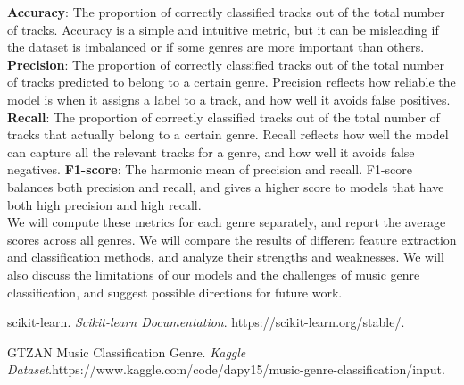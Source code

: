 \documentclass[conference]{IEEEtran}
\begin{document}
        \textbf{Accuracy}: The proportion of correctly classified tracks out of the total number of tracks. Accuracy is a simple and intuitive metric, but it can be misleading if the dataset is imbalanced or if some genres are more important than others.
        \textbf{Precision}: The proportion of correctly classified tracks out of the total number of tracks predicted to belong to a certain genre. Precision reflects how reliable the model is when it assigns a label to a track, and how well it avoids false positives.
        \newline
        \textbf{Recall}: The proportion of correctly classified tracks out of the total number of tracks that actually belong to a certain genre. Recall reflects how well the model can capture all the relevant tracks for a genre, and how well it avoids false negatives.
        \newline
        \textbf{F1-score}: The harmonic mean of precision and recall. F1-score balances both precision and recall, and gives a higher score to models that have both high precision and high recall.
        \newline \\
        We will compute these metrics for each genre separately, and report the average scores across all genres. We will compare the results of different feature extraction and classification methods, and analyze their strengths and weaknesses. We will also discuss the limitations of our models and the challenges of music genre classification, and suggest possible directions for future work.

    
    \begin{thebibliography}{99}
         scikit-learn. \textit{Scikit-learn Documentation}. https://scikit-learn.org/stable/.
        
         GTZAN Music Classification Genre. \textit{Kaggle Dataset}.{https://www.kaggle.com/code/dapy15/music-genre-classification/input}.
    \end{thebibliography}
\end{document}
